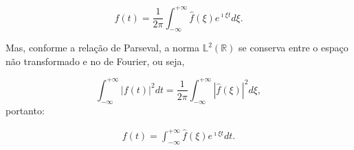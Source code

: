 \begin{equation*}
f(t) = \frac{1}{2 \pi} \int_{-\infty}^{+\infty} \hat{f}(\xi) e^{\imath \xi t}d \xi.
\end{equation*}

Mas, conforme a relação de Parseval, a norma $\mathbb{L}^{2}(\mathbb{R})$ se conserva entre o espaço não transformado e no de Fourier, ou seja, 

\begin{equation*}
\int_{-\infty}^{+\infty}|f(t)|^{2}dt = \frac{1}{2 \pi}\int_{-\infty}^{+\infty}|\hat{f}(\xi)|^{2}d \xi,
\end{equation*}
portanto:

\begin{align*}
f(t) = \int_{-\infty}^{+\infty} \hat{f}(\xi)e^{\imath \xi t} d t. \tag*{(Q.E.D.)}
\end{align*}